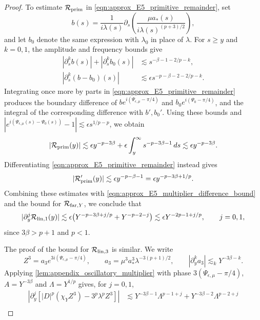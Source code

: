 \documentclass[11pt]{amsart}
\theoremstyle{definition}
\theoremstyle{remark}
\numberwithin{equation}{section}
\newcommand{\mc}[1]{\mathcal{#1}}
\begin{document}
\begin{proof}
    To estimate $\mc{R}_{\textup{prim}}$ in \eqref{eqn:approx_E5_primitive_remainder}, set
    \[
        b(s)=\frac{1}{i\lambda(s)}
        \partial_s\left(\frac{\mu a_*(s)}{i\lambda(s)^{(p+3)/2}}\right),
    \]
    and let $b_0$ denote the same expression with $\lambda_0$ in place of $\lambda$. For $s\geq y$ and $k=0,1$, the amplitude and frequency bounds give
    \[
    \begin{aligned}
        |\partial_s^kb(s)|+|\partial_s^kb_0(s)|
        &\lesssim s^{-\beta-1-2/p-k},\\
        |\partial_s^k(b-b_0)(s)|
        &\lesssim\epsilon s^{-p-\beta-2-2/p-k}.
    \end{aligned}
    \]
    Integrating once more by parts in \eqref{eqn:approx_E5_primitive_remainder} produces the boundary difference of $be^{i(\Psi_{\epsilon,\mu}-\pi/4)}$ and $b_0e^{i(\Psi_0-\pi/4)}$, and the integral of the corresponding difference with $b',b_0'$. Using these bounds and $|e^{i(\Psi_{\epsilon,\mu}(s)-\Psi_0(s))}-1|\lesssim\epsilon s^{1/p-p}$, we obtain
    \[
        |\mc{R}_{\textup{prim}}(y)|
        \lesssim\epsilon y^{-p-3\beta}
        +\epsilon\int_y^\infty s^{-p-3\beta-1}\,ds
        \lesssim\epsilon y^{-p-3\beta}.
    \]
    Differentiating \eqref{eqn:approx_E5_primitive_remainder} instead gives
    \[
        |\mc{R}_{\textup{prim}}'(y)|\lesssim\epsilon y^{-p-\beta-1}
        =\epsilon y^{-p-3\beta+1/p}.
    \]
    Combining these estimates with \eqref{eqn:approx_E5_multiplier_difference_bound} and the bound for $\mc{R}_{\textup{far},Y}$, we conclude that
    \begin{equation}\label{eqn:approx_E5_fundamental_bound}
        |\partial_y^j\mc{R}_{\textup{lin},1}(y)|
        \lesssim\epsilon\bigl(Y^{-p-3\beta+j/p}+Y^{-p-2-j}\bigr)
        \lesssim\epsilon Y^{-2p-1+j/p},\qquad j=0,1,
    \end{equation}
    since $3\beta>p+1$ and $p<1$. \par
    The proof of the bound for $\mc{R}_{\textup{lin},3}$ is similar. We write
    \[
        Z^3=a_3e^{3i(\Psi_{\epsilon,\mu}-\pi/4)},\qquad
        a_3=\mu^3a_*^3\lambda^{-3(p+1)/2},
        \qquad |\partial_y^ka_3|\lesssim_kY^{-3\beta-k}.
    \]
    Applying \cref{lem:appendix_oscillatory_multiplier} with phase $3(\Psi_{\epsilon,\mu}-\pi/4)$, $A=Y^{-3\beta}$ and $\Lambda=Y^{1/p}$ gives, for $j=0,1$,
    \[
    \begin{aligned}
        \left|\partial_y^j\left[|D|^p(\chi_YZ^3)-3^p\lambda^pZ^3\right]\right|
        &\lesssim Y^{-3\beta-1}\Lambda^{p-1+j}
        +Y^{-3\beta-2}\Lambda^{p-2+j}\\

\end{aligned}\]
\end{proof}
\end{document}
